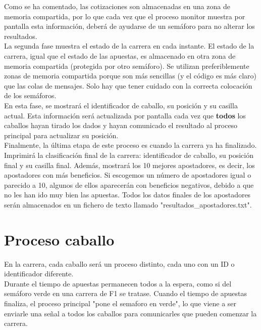 \documentclass[12pt]{article}
\begin{document}
Como se ha comentado, las cotizaciones son almacenadas en una zona de memoria compartida, por lo que cada vez que el proceso monitor muestra por pantalla esta información, deberá de ayudarse de un semáforo para no alterar los resultados.\\

La segunda fase muestra el estado de la carrera en cada instante. El estado de la carrera, igual que el estado de las apuestas, es almacenado en otra zona de memoria compartida (protegida por otro semáforo). Se utilizan preferiblemente zonas de memoria compartida porque son más sencillas (y el código es más claro) que las colas de mensajes. Solo hay que tener cuidado con la correcta colocación de los semáforos.\\

En esta fase, se mostrará el identificador de caballo, su posición y su casilla actual. Esta información será actualizada por pantalla cada vez que \textbf{todos} los caballos hayan tirado los dados y hayan comunicado el resultado al proceso principal para actualizar su posición.\\

Finalmente, la última etapa de este proceso es cuando la carrera ya ha finalizado. Imprimirá la clasificación final de la carrera: identificador de caballo, su posición final y su casilla final. Además, mostrará los 10 mejores apostadores, es decir, los apostadores con más beneficios. Si escogemos un número de apostadores igual o parecido a 10, algunos de ellos aparecerán con beneficios negativos, debido a que no les han ido muy bien las apuestas. Todos los datos finales de los apostadores serán almacenados en un fichero de texto llamado "resultados\_apostadores.txt".\\

\section{Proceso caballo}
En la carrera, cada caballo será un proceso distinto, cada uno con un ID o identificador diferente.\\

Durante el tiempo de apuestas permanecen todos a la espera, como si del semáforo verde en una carrera de F1 se tratase. Cuando el tiempo de apuestas finaliza, el proceso principal "pone el semaforo en verde", lo que viene a ser enviarle una señal a todos los caballos para comunicarles que pueden comenzar la carrera.\\
\end{document}
